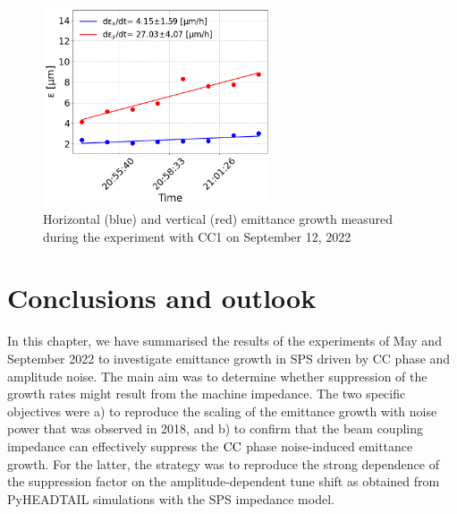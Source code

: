 \begin{figure}[!h]
   \centering         
   \includegraphics[width=0.6\textwidth]{images/Ch8/cc_md_sep22_AN_coast12.png}
       \caption{Horizontal (blue) and vertical (red) emittance growth measured during the experiment with CC1 on September 12, 2022}
       \label{fig:H_V_emit_growth_Amplitude_noise_coast12}
\end{figure}



\section{Conclusions and outlook}\label{sec:Ch8_conclusions}
In this chapter, we have summarised the results of the experiments of May and September 2022 to investigate emittance growth in SPS driven by CC phase and amplitude noise.  The main aim was to determine whether suppression of the growth rates might result from the machine impedance. The two specific objectives were a) to reproduce the scaling of the emittance growth with noise power that was observed in 2018, and b) to confirm that the beam coupling impedance can effectively suppress the ${\mathrm{CC}}$ phase noise-induced emittance growth. For the latter, the strategy was to reproduce the strong dependence of the suppression factor on the amplitude-dependent tune shift as obtained from PyHEADTAIL simulations with the SPS impedance model.

